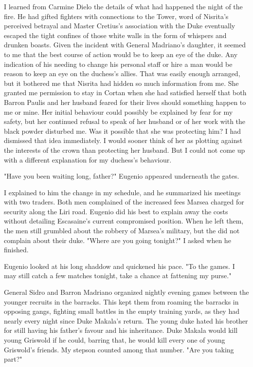 \documentclass{article}
\begin{document}
I learned from Carmine Dielo the details of what had happened the night of the fire. He had gifted fighters with connections to the Tower, word of Nisrita's perceived betrayal and Master Cretius's association with the Duke eventually escaped the tight confines of those white walls in the form of whispers and drunken boasts. Given the incident with General Madriano's daughter, it seemed to me that the best course of action would be to keep an eye of the duke. Any indication of his needing to change his personal staff or hire a man would be reason to keep an eye on the duchess's allies. That was easily enough arranged, but it bothered me that Nisrita had hidden so much information from me. She granted me permission to stay in Cortan when she had satisfied herself that both Barron Paulis and her husband feared for their lives should something happen to me or mine. Her initial behaviour could possibly be explained by fear for my safety, but her continued refusal to speak of her husband or of her work with the black powder disturbed me. Was it possible that she was protecting him? I had dismissed that idea immediately. I would sooner think of her as plotting against the interests of the crown than protecting her husband. But I could not come up with a different explanation for my duchess's behaviour. 

"Have you been waiting long, father?" Eugenio appeared underneath the gates. 

I explained to him the change in my schedule, and he summarized his meetings with two traders. Both men complained of the increased fees Marsea charged for security along the Liri road. Eugenio did his best to explain away the costs without detailing Escasaine's current compromised position. When he left them, the men still grumbled about the robbery of Marsea's military, but the did not complain about their duke. "Where are you going tonight?" I asked when he finished.

Eugenio looked at his long shaddow and quickened his pace. "To the games. I may still catch a few matches tonight, take a chance at fattening my purse."

General Sidro and Barron Madriano organized nightly evening games between the younger recruits in the barracks. This kept them from roaming the barracks in opposing gangs, fighting small battles in the empty training yards, as they had nearly every night since Duke Makala's return. The young duke hated his brother for still having his father's favour and his inheritance. Duke Makala would kill young Griswold if he could, barring that, he would kill every one of young Griswold's friends. My stepson counted among that number. "Are you taking part?"
\end{document}
